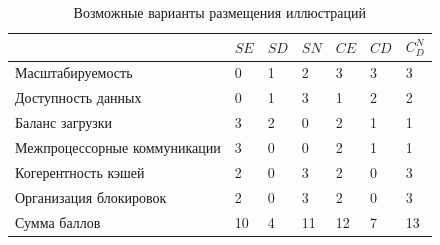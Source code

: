 \documentclass[11pt,oneside]{article}
\begin{document}
\begin{table}[h]
\caption{Возможные варианты размещения иллюстраций}
\medskip
\begin{tabular}{|p{6cm}||p{0.5cm}||p{0.5cm}||p{0.5cm}||p{0.5cm}||p{0.5cm}||p{0.5cm}|}
\hline
$ $ & $SE$ & $SD$ & $SN$ & $CE$ & $CD$ & $$C_{D}^{N}$$\\
\hline
Масштабируемость & 0 & 1 & 2 & 3 & 3 & 3 \\
\hline
Доступность данных & 0 & 1 & 3 & 1 & 2 & 2 \\
\hline
Баланс загрузки & 3 & 2 & 0 & 2 & 1 & 1 \\
\hline
Межпроцессорные коммуникации & 3 & 0 & 0 & 2 & 1 & 1 \\
\hline
Когерентность кэшей & 2 & 0 & 3 & 2 & 0 & 3 \\
\hline
Организация блокировок & 2 & 0 & 3 & 2 & 0 & 3 \\
\hline
Сумма баллов & 10 & 4 & 11 & 12 & 7 & 13 \\
\hline
\end{tabular}
\label{table1}
\end{table}
\end{document}
